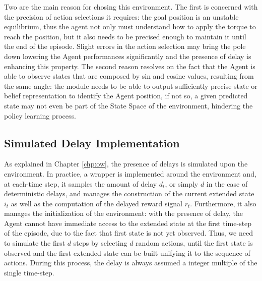             Two are the main reason for chosing this environment. The first is concerned with the precision of action selections it requires: the goal position is an unstable equilibrium, thus the agent not only must understand how to apply the torque to reach the position, but it also needs to be precised enough to maintain it until the end of the episode. Slight errors in the action selection may bring the pole down lowering the Agent performances significantly and the presence of delay is enhancing this property. The second reason resolves on the fact that the Agent is able to observe states that are composed by sin and cosine values, resulting from the same angle: the module needs to be able to output sufficiently precise state or belief representation to identify the Agent position, if not so, a given predicted state may not even be part of the State Space of the environment, hindering the policy learning process.
            
        \subsection{Simulated Delay Implementation}
        \label{sub:simulated_delays}
            As explained in Chapter \ref{chp:ow}, the presence of delays is simulated upon the environment. In practice, a wrapper is implemented around the environment and, at each-time step, it samples the amount of delay $d_t$, or simply $d$ in the case of deterministic delays, and manages the construction of the current extended state $i_t$ as well as the computation of the delayed reward signal $r_t$. Furthermore, it also manages the initialization of the environment: with the presence of delay, the Agent cannot have immediate access to the extended state at the first time-step of the episode, due to the fact that first state is not yet observed. Thus, we need to simulate the first $d$ steps by selecting $d$ random actions, until the first state is observed and the first extended state can be built unifying it to the sequence of actions. During this process, the delay is always assumed a integer multiple of the single time-step.
            
